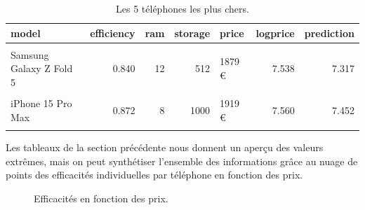 \documentclass[
  12pt,
]{report}
\begin{document}
\begin{table}[!h]

\caption{\label{tab:kbl_inexpensive}Les 5 téléphones les plus chers.}
\centering
\begin{tabular}[t]{lrrrlrr}
\toprule
\textbf{model} & \textbf{efficiency} & \textbf{ram} & \textbf{storage} & \textbf{price} & \textbf{logprice} & \textbf{prediction}\\
\midrule
\cellcolor{gray!6}{Samsung Galaxy S24 Ultra} & \cellcolor{gray!6}{0.861} & \cellcolor{gray!6}{12} & \cellcolor{gray!6}{1000} & \cellcolor{gray!6}{1829 €} & \cellcolor{gray!6}{7.512} & \cellcolor{gray!6}{7.361}\\
Samsung Galaxy Z Fold 5 & 0.840 & 12 & 512 & 1879 € & 7.538 & 7.317\\
\cellcolor{gray!6}{Samsung Galaxy Z Fold 5} & \cellcolor{gray!6}{0.811} & \cellcolor{gray!6}{12} & \cellcolor{gray!6}{512} & \cellcolor{gray!6}{1879 €} & \cellcolor{gray!6}{7.538} & \cellcolor{gray!6}{7.230}\\
iPhone 15 Pro Max & 0.872 & 8 & 1000 & 1919 € & 7.560 & 7.452\\
\cellcolor{gray!6}{HONOR V2} & \cellcolor{gray!6}{0.554} & \cellcolor{gray!6}{16} & \cellcolor{gray!6}{512} & \cellcolor{gray!6}{1999 €} & \cellcolor{gray!6}{7.600} & \cellcolor{gray!6}{6.636}\\
\bottomrule
\end{tabular}
\end{table}

\newpage

Les tableaux de la section précédente nous donnent un aperçu des valeurs
extrêmes, mais on peut synthétiser l'ensemble des informations grâce au
nuage de points des efficacités individuelles par téléphone en fonction
des prix.

\begin{figure}


\caption{\label{fig-efficiency-smartspecs}Efficacités en fonction des
prix.}

\end{figure}%
\end{document}
